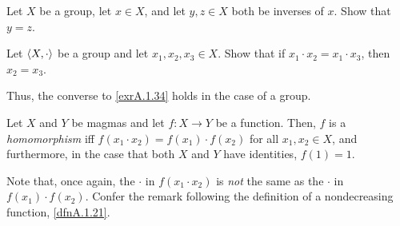 \begin{exr}\label{exrA.1.79}
Let $X$ be a group, let $x\in X$, and let $y,z\in X$ both be inverses of $x$.  Show that $y=z$.
\end{exr}
\begin{exr}
Let $\langle X,\cdot\rangle$ be a group and let $x_1,x_2,x_3\in X$.  Show that if $x_1\cdot x_2=x_1\cdot x_3$, then $x_2=x_3$.
\begin{rmk}
Thus, the converse to \cref{exrA.1.34} holds in the case of a group.
\end{rmk}
\end{exr}
\begin{dfn}
Let $X$ and $Y$ be magmas and let $f:X\rightarrow Y$ be a function.  Then, $f$ is a \emph{homomorphism} iff $f(x_1\cdot x_2)=f(x_1)\cdot f(x_2)$ for all $x_1,x_2\in X$, and furthermore, in the case that both $X$ and $Y$ have identities, $f(1)=1$.
\begin{rmk}
Note that, once again, the $\cdot$ in $f(x_1\cdot x_2)$ is \emph{not} the same as the $\cdot$ in $f(x_1)\cdot f(x_2)$.  Confer the remark following the definition of a nondecreasing function, \cref{dfnA.1.21}.
\end{rmk}
\end{dfn}

